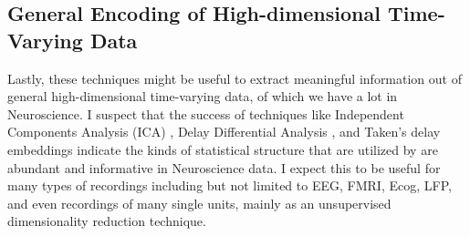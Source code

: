 \subsection{General Encoding of High-dimensional Time-Varying Data}
Lastly, these techniques might be useful to extract meaningful information out of general high-dimensional time-varying data, of which we have a lot in Neuroscience. I suspect that the success of techniques like Independent Components Analysis (ICA) \cite{ICA}, Delay Differential Analysis \cite{DDA}, and Taken's delay embeddings indicate the kinds of statistical structure that are utilized by \CPC are abundant and informative in Neuroscience data. I expect this to be useful for many types of recordings including but not limited to EEG, FMRI, Ecog, LFP, and even recordings of many single units, mainly as an unsupervised dimensionality reduction technique.